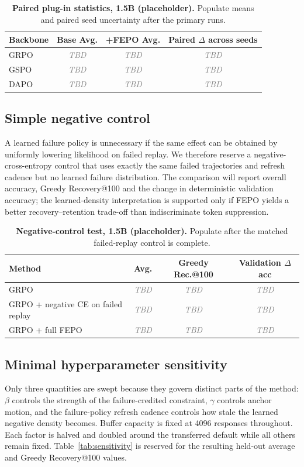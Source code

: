 \documentclass{article}
\newcommand{\TBD}{\textcolor{gray}{\textit{TBD}}}
\newcommand{\FEPO}{\textsc{FEPO}\xspace}
\begin{document}
\begin{table}[h]
\centering
\small
\begin{tabular}{lccc}
\toprule
Backbone & Base Avg. & +\FEPO Avg. & Paired $\Delta$ across seeds\\
\midrule
GRPO & \TBD & \TBD & \TBD\\
GSPO & \TBD & \TBD & \TBD\\
DAPO & \TBD & \TBD & \TBD\\
\bottomrule
\end{tabular}
\caption{\textbf{Paired plug-in statistics, 1.5B (placeholder).} Populate means and paired seed uncertainty after the primary runs.}
\label{tab:plugin}
\end{table}

\subsection{Simple negative control}
A learned failure policy is unnecessary if the same effect can be obtained by uniformly lowering likelihood on failed replay. We therefore reserve a negative-cross-entropy control that uses exactly the same failed trajectories and refresh cadence but no learned failure distribution. The comparison will report overall accuracy, Greedy Recovery@100 and the change in deterministic validation accuracy; the learned-density interpretation is supported only if \FEPO yields a better recovery--retention trade-off than indiscriminate token suppression.

\begin{table}[h]
\centering
\small
\begin{tabular}{lccc}
\toprule
Method & Avg. & Greedy Rec.@100 & Validation $\Delta$acc\\
\midrule
GRPO & \TBD & \TBD & \TBD\\
GRPO + negative CE on failed replay & \TBD & \TBD & \TBD\\
GRPO + full \FEPO & \TBD & \TBD & \TBD\\
\bottomrule
\end{tabular}
\caption{\textbf{Negative-control test, 1.5B (placeholder).} Populate after the matched failed-replay control is complete.}
\label{tab:negce}
\end{table}

\subsection{Minimal hyperparameter sensitivity}
Only three quantities are swept because they govern distinct parts of the method: $\beta$ controls the strength of the failure-credited constraint, $\gamma$ controls anchor motion, and the failure-policy refresh cadence controls how stale the learned negative density becomes. Buffer capacity is fixed at 4096 responses throughout. Each factor is halved and doubled around the transferred default while all others remain fixed. Table~\ref{tab:sensitivity} is reserved for the resulting held-out average and Greedy Recovery@100 values.
\end{document}
